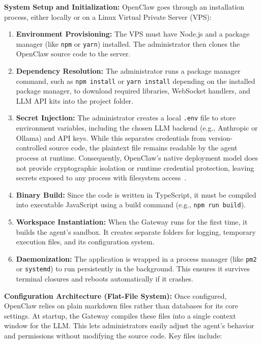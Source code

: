 \documentclass[a4paper]{report}
\begin{document}
\textbf{System Setup and Initialization:} OpenClaw goes through an installation process, either locally or on a Linux Virtual Private Server (VPS):

\begin{enumerate}
    \item \textbf{Environment Provisioning:} The VPS must have Node.js and a package manager (like \texttt{npm} or \texttt{yarn}) installed. The administrator then clones the OpenClaw source code to the server.

    \item \textbf{Dependency Resolution:} The administrator runs a package manager command, such as \texttt{npm install} or \texttt{yarn install} depending on the installed package manager, to download required libraries, WebSocket handlers, and LLM API kits into the project folder.

    \item \textbf{Secret Injection:} The administrator creates a local \texttt{.env} file to store environment variables, including the chosen LLM backend (e.g., Anthropic or Ollama) and API keys. While this separates credentials from version-controlled source code, the plaintext file remains readable by the agent process at runtime. Consequently, OpenClaw's native deployment model does not provide cryptographic isolation or runtime credential protection, leaving secrets exposed to any process with filesystem access~\cite{foerster2026camels}.

    \item \textbf{Binary Build:} Since the code is written in TypeScript, it must be compiled into executable JavaScript using a build command (e.g., \texttt{npm run build}).

    \item \textbf{Workspace Instantiation:} When the Gateway runs for the first time, it builds the agent's sandbox. It creates separate folders for logging, temporary execution files, and its configuration system.

    \item \textbf{Daemonization:} The application is wrapped in a process manager (like \texttt{pm2} or \texttt{systemd}) to run persistently in the background. This ensures it survives terminal closures and reboots automatically if it crashes.
\end{enumerate}

\textbf{Configuration Architecture (Flat-File System):} Once configured, OpenClaw relies on plain markdown files rather than databases for its core settings. At startup, the Gateway compiles these files into a single context window for the LLM. This lets administrators easily adjust the agent's behavior and permissions without modifying the source code. Key files include:
\end{document}
